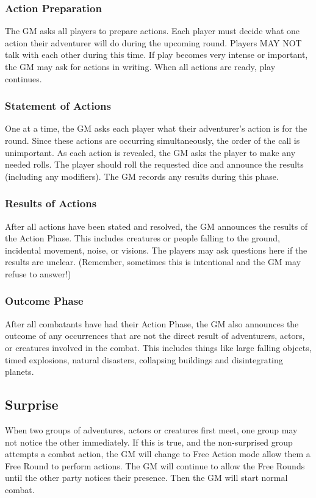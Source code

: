 \begin{multicols*}{2}
\subsubsection{Action Preparation}
The GM asks all players to prepare actions. Each player must decide what one action their adventurer will do during the upcoming round. Players MAY NOT talk with each other during this time. If play becomes very intense or important, the GM may ask for actions in writing. When all actions are ready, play continues.
\subsubsection{Statement of Actions}
One at a time, the GM asks each player what their adventurer's action is for the round. Since these actions are occurring simultaneously, the order of the call is unimportant. As each action is revealed, the GM asks the player to make any needed rolls. The player should roll the requested dice and announce the results (including any modifiers). The GM records any results during this phase.
\subsubsection{Results of Actions}
After all actions have been stated and resolved, the GM announces the results of the Action Phase. This includes creatures or people falling to the ground, incidental movement, noise, or visions. The players may ask questions here if the results are unclear. (Remember, sometimes this is intentional and the GM may refuse to answer!)
\subsubsection{Outcome Phase}
After all combatants have had their Action Phase, the GM also announces the outcome of any occurrences that are not the direct result of adventurers, actors, or creatures involved in the combat. This includes things like large falling objects, timed explosions, natural disasters, collapsing buildings and disintegrating planets.
\subsection{Surprise}
When two groups of adventures, actors or creatures first meet, one group may not notice the other immediately. If this is true, and the non-surprised group attempts a combat
action, the GM will change to Free Action mode allow them a Free Round to perform actions. The GM will continue to allow the Free Rounds until the other party notices their presence. Then the GM will start normal combat.

\end{multicols*}
